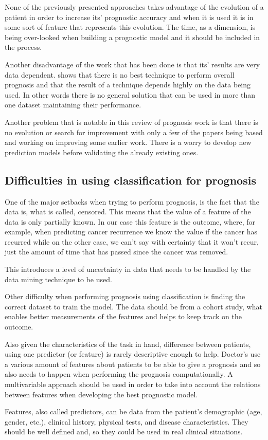 None of the previously presented approaches takes advantage of the evolution of a patient in order to increase its’ prognostic
 accuracy and when it is used it is in some sort of feature that represents this evolution. The time, as a dimension, is being 
 over-looked when building a prognostic model and it should be included in the process.

Another disadvantage of the work that has been done is that its’ results are very data dependent. \cite{Endo2008}
 shows that there is no best technique to perform overall prognosis and that the result of a technique depends highly on the data 
 being used. In other words there is no general solution that can be used in more than one dataset maintaining their performance.

Another problem that is notable in this review of prognosis work is that there is no evolution or search for improvement with
 only a few of the papers being based and working on improving some earlier work. There is a worry to develop new prediction 
 models before validating the already existing ones.
 
 \subsection{Difficulties in using classification for prognosis}
 \label{subsection:difficulties}
 
One of the major setbacks when trying to perform prognosis, is the fact that the data is, what is called, censored. This means that 
the value of a feature of the data is only partially known. In our case this feature is the outcome, where, for example, when 
predicting cancer recurrence we know the value if the cancer has recurred while on the other case, we can’t say with certainty 
that it won’t recur, just the amount of time that has passed since the cancer was removed. 

This introduces a level of uncertainty in data that needs to be handled by the data mining technique to be used.

Other difficulty when performing prognosis using classification is finding the correct dataset to train the model. The data
 should be from a cohort study, what enables better measurements of the features and helps to keep track on the outcome.

Also given the characteristics of the task in hand, difference between patients, using one predictor (or feature) is rarely 
descriptive enough to help. Doctor’s use a various amount of features about patients to be able to give a prognosis and so 
also needs to happen when performing the prognosis computationally. A multivariable approach should be used in order to take
 into account the relations between features when developing the best prognostic model.

Features, also called predictors, can be data from the patient’s demographic (age, gender, etc.), clinical history, physical 
tests, and disease characteristics. They should be well defined and, so they could be used in real clinical situations.



 
\cleardoublepage